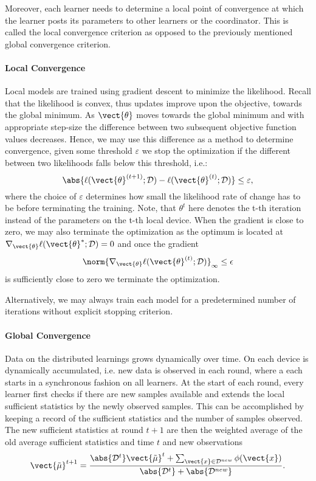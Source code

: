 Moreover, each learner needs to determine a local point of convergence at which the learner posts its parameters to other learners or the coordinator. 
This is called the local convergence criterion as opposed to the previously mentioned global convergence criterion.

\paragraph*{Local Convergence}
Local models are trained using gradient descent to minimize the likelihood. 
Recall that the likelihood is convex, thus updates improve upon the objective, towards the global minimum.
As $\vect{\theta}$ moves towards the global minimum and with appropriate step-size the difference between two subsequent objective function values decreases.
Hence, we may use this difference as a method to determine convergence, given some threshold $\varepsilon$ we stop the optimization if the different between two likelihoods falls below this threshold, i.e.:
\begin{equation}
    \abs{\ell(\vect{\theta}^{(t+1)} ; \mathcal{D}) - \ell(\vect{\theta}^{(t)} ; \mathcal{D})} \leq \varepsilon,
\end{equation}
where the choice of $\varepsilon$ determines how small the likelihood rate of change has to be before terminating the training.
Note, that $\theta^t$ here denotes the t-th iteration instead of the parameters on the t-th local device.
When the gradient is close to zero, we may also terminate the optimization as the optimum is located at $\nabla_{\vect{\theta}} \ell(\vect{\theta}^{*} ; \mathcal{D}) = 0$ and once the gradient
\begin{equation}
    \norm{\nabla_{\vect{\theta}} \ell(\vect{\theta}^{(t)} ; \mathcal{D})}_{\infty} \leq \epsilon
\end{equation}
is sufficiently close to zero we terminate the optimization. 

Alternatively, we may always train each model for a predetermined number of iterations without explicit stopping criterion.

\paragraph*{Global Convergence}

Data on the distributed learnings grows dynamically over time.
On each device is dynamically accumulated, i.e. new data is observed in each round, where a each starts in a synchronous fashion on all learners.
At the start of each round, every learner first checks if there are new samples available and extends the local sufficient statistics by the newly observed samples.
This can be accomplished by keeping a record of the sufficient statistics and the number of samples observed.
The new sufficient statistics at round $t+1$ are then the weighted average of the old average sufficient statistics and time $t$ and new observations 
\begin{equation}
    \vect{\tilde{\mu}}^{t+1} = \frac{\abs{\mathcal{D}^{t}}\vect{\tilde{\mu}}^t + \sum_{\vect{x} \in \mathcal{D}^{new}} \phi(\vect{x})}{\abs{\mathcal{D}^{t}} + \abs{\mathcal{D}^{new}}}.
\end{equation}

